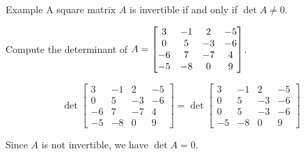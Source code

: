 \documentclass[xcolor=dvipsnames,aspectratio=169,t]{beamer}
\begin{document}
\begin{frame}{Example}
  \bbox
  A square matrix \alert{$A$ is invertible} if and only if \alert{$\det A \ne 0$}.
  \ebox

  Compute the determinant of $\displaystyle A =  \begin{bmatrix} 3 & -1 & 2 & -5\\
  0 & 5 & -3 & -6\\
  -6 & 7 & -7 & 4\\
  -5 & -8 & 0 & 9 \end{bmatrix}$. \bs

  \pause
  \[ \det \begin{bmatrix} 3 & -1 & 2 & -5\\
  0 & 5 & -3 & -6\\
  -6 & 7 & -7 & 4\\
  -5 & -8 & 0 & 9 \end{bmatrix} = 
  \det  \begin{bmatrix} 3 & -1 & 2 & -5\\
  0 & 5 & -3 & -6\\
  0 & 5 & -3 & -6\\
  -5 & -8 & 0 & 9 \end{bmatrix}  \]
  \ms
  
  Since $A$ is \alert{not invertible}, we have $\det A = 0$.
\end{frame}
\end{document}
